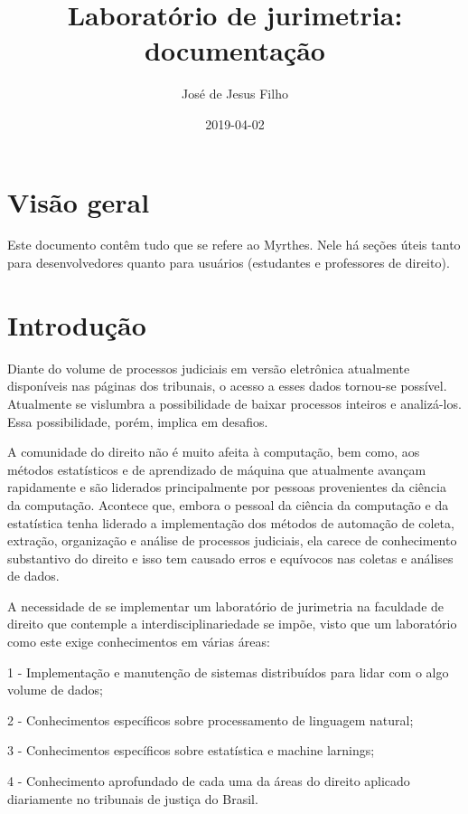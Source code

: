 \documentclass[]{book}
\title{Laboratório de jurimetria: documentação}
\author{José de Jesus Filho}
\date{2019-04-02}
\begin{document}
\maketitle

{
\setcounter{tocdepth}{1}
\tableofcontents
}
\hypertarget{visao-geral}{%
\chapter{Visão geral}\label{visao-geral}}

Este documento contêm tudo que se refere ao Myrthes. Nele há seções úteis tanto para desenvolvedores quanto para usuários (estudantes e professores de direito).

\hypertarget{intro}{%
\chapter{Introdução}\label{intro}}

Diante do volume de processos judiciais em versão eletrônica atualmente disponíveis nas páginas dos tribunais, o acesso a esses dados tornou-se possível. Atualmente se vislumbra a possibilidade de baixar processos inteiros e analizá-los. Essa possibilidade, porém, implica em desafios.

A comunidade do direito não é muito afeita à computação, bem como, aos métodos estatísticos e de aprendizado de máquina que atualmente avançam rapidamente e são liderados principalmente por pessoas provenientes da ciência da computação. Acontece que, embora o pessoal da ciência da computação e da estatística tenha liderado a implementação dos métodos de automação de coleta, extração, organização e análise de processos judiciais, ela carece de conhecimento substantivo do direito e isso tem causado erros e equívocos nas coletas e análises de dados.

A necessidade de se implementar um laboratório de jurimetria na faculdade de direito que contemple a interdisciplinariedade se impõe, visto que um laboratório como este exige conhecimentos em várias áreas:

1 - Implementação e manutenção de sistemas distribuídos para lidar com o algo volume de dados;

2 - Conhecimentos específicos sobre processamento de linguagem natural;

3 - Conhecimentos específicos sobre estatística e machine larnings;

4 - Conhecimento aprofundado de cada uma da áreas do direito aplicado diariamente no tribunais de justiça do Brasil.
\end{document}
